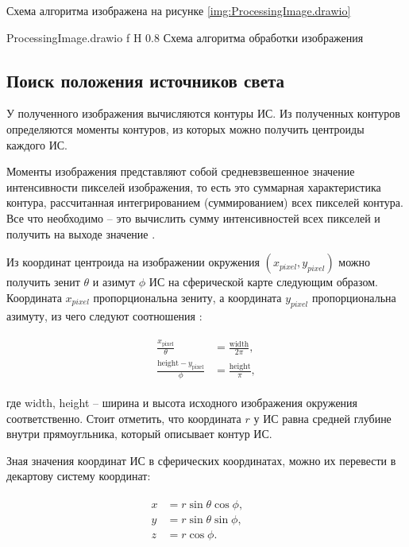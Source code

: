 Схема алгоритма изображена на рисунке \ref{img:ProcessingImage.drawio}

{ProcessingImage.drawio}
{f}
{H}
{0.8\textwidth}
{Схема алгоритма обработки изображения}

\subsection{Поиск положения источников света}

У полученного изображения вычисляются контуры ИС. Из полученных контуров определяются моменты контуров, из которых можно получить центроиды каждого ИС. 

Моменты изображения представляют собой средневзвешенное значение интенсивности пикселей изображения, то есть это суммарная характеристика контура, рассчитанная интегрированием (суммированием) всех пикселей контура. Все что необходимо -- это вычислить сумму интенсивностей всех пикселей и получить на выходе значение \cite{sns_tras}.

Из координат центроида на изображении окружения $(x_{pixel}, y_{pixel})$ можно получить зенит $\theta$ и азимут $\phi$ ИС на сферической карте следующим образом. Координата $x_{pixel}$ пропорциональна зениту, а координата $y_{pixel}$ пропорциональна азимуту, из чего следуют соотношения \cite{osti2019real}:

\begin{equation}
	\begin{aligned}
		\begin{split}
			\frac{x_{\text{pixel}}}{\theta} &= \frac{\text{width}}{2\pi}, \\
			\frac{\text{height} - y_{\text{pixel}}}{\phi} &= \frac{\text{height}}{\pi}, 
		\end{split}
	\end{aligned}
\end{equation}

где width, height -- ширина и высота исходного изображения окружения соответственно. Стоит отметить, что координата $r$ у ИС равна средней глубине внутри прямоугльника, который описывает контур ИС.

Зная значения координат ИС в сферических координатах, можно их перевести в декартову систему координат:

\begin{equation}
	\begin{aligned}
		\begin{split}
			x &= r \sin\theta \cos\phi, &&\\
			y &= r \sin\theta \sin\phi, &&\\
			z &= r \cos\phi. &&\\
		\end{split}
	\end{aligned}
\end{equation}

